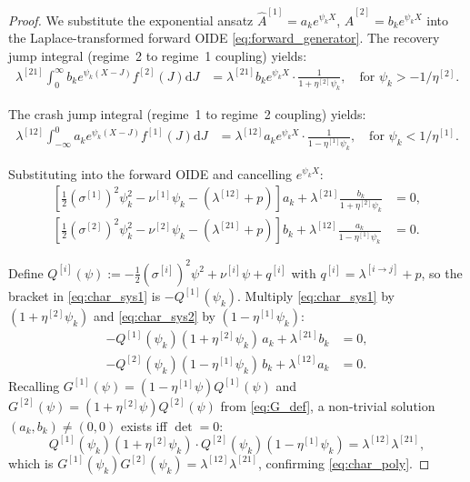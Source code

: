 \documentclass[11pt,a4paper]{article}
\numberwithin{equation}{section}
\newcommand{\dd}{\mathrm{d}}
\begin{document}
\begin{appendices}
\begin{proof}
We substitute the exponential ansatz $\hat{A}^{[1]} = a_k e^{\psi_k X}$, $\hat{A}^{[2]} = b_k e^{\psi_k X}$ into the Laplace-transformed forward OIDE \eqref{eq:forward_generator}. The recovery jump integral (regime~2 to regime~1 coupling) yields:
\begin{align}
\lambda^{[21]}\!\int_0^{\infty} b_k e^{\psi_k(X-J)} f^{[2]}(J) \dd J &= \lambda^{[21]} b_k e^{\psi_k X} \cdot \frac{1}{1 + \eta^{[2]}\psi_k}, \quad \text{for } \psi_k > -1/\eta^{[2]}.
\end{align}

The crash jump integral (regime~1 to regime~2 coupling) yields:
\begin{align}
\lambda^{[12]}\!\int_{-\infty}^0 a_k e^{\psi_k(X-J)} f^{[1]}(J) \dd J &= \lambda^{[12]} a_k e^{\psi_k X} \cdot \frac{1}{1 - \eta^{[1]}\psi_k}, \quad \text{for } \psi_k < 1/\eta^{[1]}.
\end{align}

Substituting into the forward OIDE and cancelling $e^{\psi_k X}$:
\begin{align}
\left[\tfrac{1}{2}(\sigma^{[1]})^2\psi_k^2 - \nu^{[1]}\psi_k - (\lambda^{[12]}+p)\right] a_k + \lambda^{[21]} \frac{b_k}{1+\eta^{[2]}\psi_k} &= 0, \label{eq:char_sys1} \\
\left[\tfrac{1}{2}(\sigma^{[2]})^2\psi_k^2 - \nu^{[2]}\psi_k - (\lambda^{[21]}+p)\right] b_k + \lambda^{[12]} \frac{a_k}{1-\eta^{[1]}\psi_k} &= 0. \label{eq:char_sys2}
\end{align}

Define $Q^{[i]}(\psi) := -\tfrac{1}{2}(\sigma^{[i]})^2\psi^2 + \nu^{[i]}\psi + q^{[i]}$ with $q^{[i]} = \lambda^{[i\to j]} + p$, so the bracket in \eqref{eq:char_sys1} is $-Q^{[1]}(\psi_k)$. Multiply \eqref{eq:char_sys1} by $(1+\eta^{[2]}\psi_k)$ and \eqref{eq:char_sys2} by $(1-\eta^{[1]}\psi_k)$:
\begin{align}
-Q^{[1]}(\psi_k)(1+\eta^{[2]}\psi_k) \, a_k + \lambda^{[21]} b_k &= 0, \label{eq:Gb_sys1} \\
-Q^{[2]}(\psi_k)(1-\eta^{[1]}\psi_k) \, b_k + \lambda^{[12]} a_k &= 0. \label{eq:Gb_sys2}
\end{align}
Recalling $G^{[1]}(\psi) = (1-\eta^{[1]}\psi)Q^{[1]}(\psi)$ and $G^{[2]}(\psi) = (1+\eta^{[2]}\psi)Q^{[2]}(\psi)$ from \eqref{eq:G_def}, a non-trivial solution $(a_k, b_k) \neq (0,0)$ exists iff $\det = 0$:
\begin{equation}
Q^{[1]}(\psi_k)(1+\eta^{[2]}\psi_k) \cdot Q^{[2]}(\psi_k)(1-\eta^{[1]}\psi_k) = \lambda^{[12]}\lambda^{[21]},
\end{equation}
which is $G^{[1]}(\psi_k) G^{[2]}(\psi_k) = \lambda^{[12]}\lambda^{[21]}$, confirming \eqref{eq:char_poly}.


\end{proof}
\end{appendices}
\end{document}
